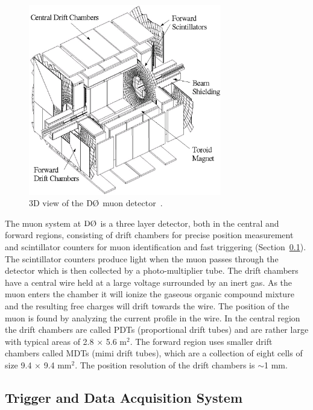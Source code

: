 \begin{figure}[!h!tbp]
\begin{center}
\includegraphics[width=0.75\textwidth]{eps/D0/mudet.eps}
\end{center}
\vspace{-0.1in}
\caption{3D view of the $\dzero$ muon detector~\cite{Abazov:2005pn}.}
\label{MuonDetector}
\end{figure}

The muon system at $\dzero$ is a three layer detector, both in the central and forward regions, consisting of drift chambers for precise position measurement and scintillator counters for muon identification and fast triggering (Section~\ref{triggersystem}). The scintillator counters produce light when the muon passes through the detector which is then collected by a photo-multiplier tube. The drift chambers have a central wire held at a large voltage surrounded by an inert gas. As the muon enters the chamber it will ionize the gaseous organic compound mixture and the resulting free charges will drift towards the wire. The position of the muon is found by analyzing the current profile in the wire. In the central region the drift chambers are called PDTs (proportional drift tubes) and are rather large with typical areas of 2.8 $\times$ 5.6 m$^{2}$. The forward region uses smaller drift chambers called MDTs (mimi drift tubes), which are a collection of eight cells of size 9.4 $\times$ 9.4 mm$^{2}$. The position resolution of the drift chambers is $\sim$1 mm.

\subsection{Trigger and Data Acquisition System}
\label{triggersystem}

